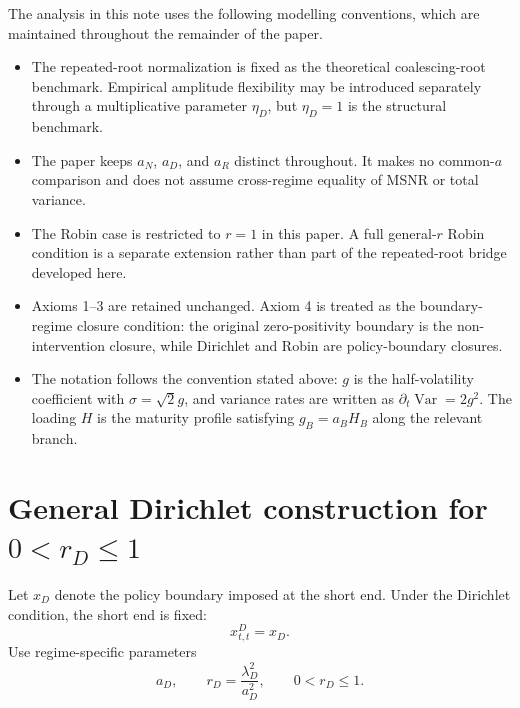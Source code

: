 \documentclass[11pt]{article}
\newcommand{\Var}{\operatorname{Var}}
\numberwithin{equation}{section}
\begin{document}
The analysis in this note uses the following modelling conventions, which are maintained throughout the remainder of the paper.
\begin{itemize}
  \item The repeated-root normalization is fixed as the theoretical coalescing-root benchmark. Empirical amplitude flexibility may be introduced separately through a multiplicative parameter $\eta_D$, but $\eta_D=1$ is the structural benchmark.
  \item The paper keeps $a_N$, $a_D$, and $a_R$ distinct throughout. It makes no common-$a$ comparison and does not assume cross-regime equality of MSNR or total variance.
  \item The Robin case is restricted to $r=1$ in this paper. A full general-$r$ Robin condition is a separate extension rather than part of the repeated-root bridge developed here.
  \item Axioms 1--3 are retained unchanged. Axiom 4 is treated as the boundary-regime closure condition: the original zero-positivity boundary is the non-intervention closure, while Dirichlet and Robin are policy-boundary closures.
  \item The notation follows the convention stated above: $g$ is the half-volatility coefficient with $\sigma=\sqrt{2}g$, and variance rates are written as $\partial_t\Var=2g^2$. The loading $H$ is the maturity profile satisfying $g_B=a_BH_B$ along the relevant branch.
\end{itemize}


\section{General Dirichlet construction for \texorpdfstring{$0<r_D\leq 1$}{0 < rD <= 1}}

Let $x_D$ denote the policy boundary imposed at the short end. Under the Dirichlet condition, the short end is fixed:
\begin{equation}
x^D_{t,t}=x_D.
\end{equation}
Use regime-specific parameters
\begin{equation}
a_D,\qquad r_D=\frac{\lambda_D^2}{a_D^2},\qquad 0<r_D\leq1.
\end{equation}
\end{document}
